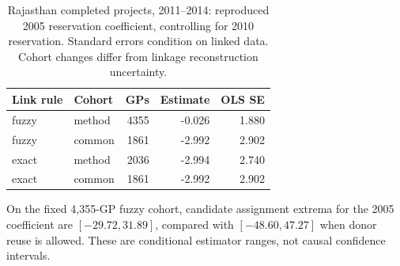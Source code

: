 \begin{table}[htbp]\centering\small
\caption{Rajasthan completed projects, 2011--2014: reproduced 2005 reservation coefficient, controlling for 2010 reservation. Standard errors condition on linked data. Cohort changes differ from linkage reconstruction uncertainty.}
\begin{tabular}{llrrr}\toprule
Link rule & Cohort & GPs & Estimate & OLS SE\\\midrule
fuzzy & method & 4355 & -0.026 & 1.880\\
fuzzy & common & 1861 & -2.992 & 2.902\\
exact & method & 2036 & -2.994 & 2.740\\
exact & common & 1861 & -2.992 & 2.902\\
\bottomrule\end{tabular}
\end{table}
On the fixed 4,355-GP fuzzy cohort, candidate assignment extrema for the 2005 coefficient are $[-29.72,31.89]$, compared with $[-48.60,47.27]$ when donor reuse is allowed. These are conditional estimator ranges, not causal confidence intervals.
